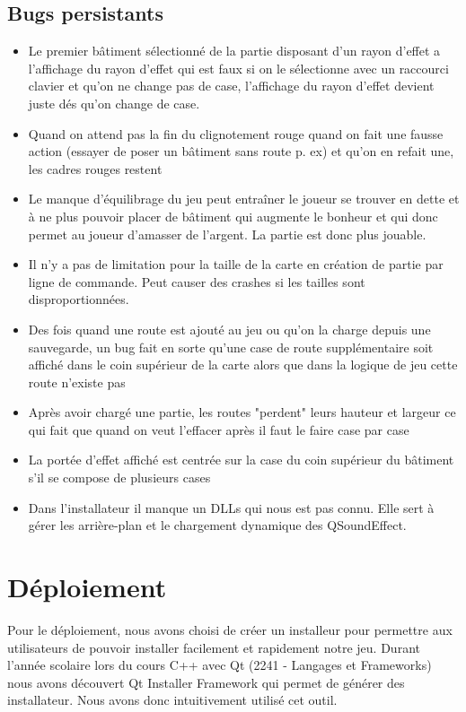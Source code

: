 \documentclass[a4paper,10pt,openany,oneside]{report}
\begin{document}
\subsection{Bugs persistants}
\begin{itemize}
\item Le premier bâtiment sélectionné de la partie disposant d'un rayon d'effet a l'affichage du rayon d'effet qui est faux si on le sélectionne avec un raccourci clavier et qu'on ne change pas de case, l'affichage du rayon d'effet devient juste dés qu'on change de case.
\item Quand on attend pas la fin du clignotement rouge quand on fait une fausse action (essayer de poser un bâtiment sans route p. ex) et qu'on en refait une, les cadres rouges restent
\item Le manque d'équilibrage du jeu peut entraîner le joueur se trouver en dette et à ne plus pouvoir placer de bâtiment qui augmente le bonheur et qui donc permet au joueur d'amasser de l'argent. La partie est donc plus jouable.
\item Il n'y a pas de limitation pour la taille de la carte en création de partie par ligne de commande. Peut causer des crashes si les tailles sont disproportionnées.
\item Des fois quand une route est ajouté au jeu ou qu'on la charge depuis une sauvegarde, un bug fait en sorte qu'une case de route supplémentaire soit affiché dans le coin supérieur de la carte alors que dans la logique de jeu cette route n'existe pas
\item Après avoir chargé une partie, les routes "perdent" leurs hauteur et largeur ce qui fait que quand on veut l'effacer après il faut le faire case par case
\item La portée d'effet affiché est centrée sur la case du coin supérieur du bâtiment s'il se compose de plusieurs cases
\item Dans l'installateur il manque un DLLs qui nous est pas connu. Elle sert à gérer les arrière-plan et le chargement dynamique des QSoundEffect.
\end{itemize}


\section{Déploiement}
Pour le déploiement, nous avons choisi de créer un installeur pour permettre aux utilisateurs de pouvoir installer  facilement et rapidement notre jeu. Durant l'année scolaire lors du cours C++ avec Qt (2241 - Langages et Frameworks) nous avons découvert Qt Installer Framework qui permet de générer des installateur. Nous avons donc intuitivement utilisé cet outil.
\newline
\end{document}
